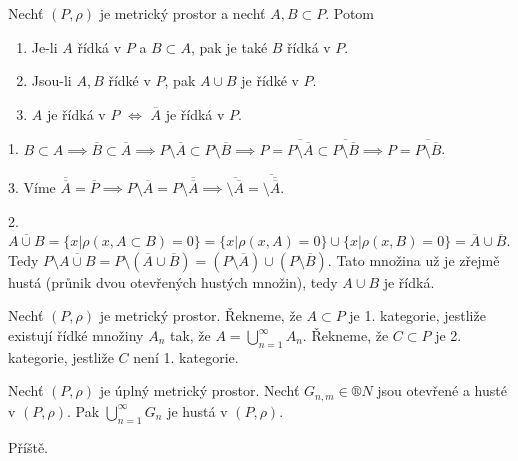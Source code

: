 \documentclass[12pt]{article}					%
\begin{document}
		\begin{veta}
			Nechť $(P, \rho)$ je metrický prostor a nechť $A, B \subset P$. Potom
			
			\begin{enumerate}
				\item Je-li $A$ řídká v $P$ a $B \subset A$, pak je také $B$ řídká v $P$.
				\item Jsou-li $A, B$ řídké v $P$, pak $A \cup B$ je řídké v $P$.
				\item $A$ je řídká v $P$ $\Leftrightarrow$ $\overline{A}$ je řídká v $P$.
			\end{enumerate}

			\begin{dukazin}
				1. $B \subset A \implies \overline{B} \subset \overline{A} \implies P \setminus \overline{A} \subset P \setminus \overline{B} \implies P = \overline{P\setminus \overline{A}} \subset \overline{P\setminus \overline{B}} \implies P = \overline{P\setminus \overline{B}}$.

				3. Víme $\overline{\overline{A}} = \overline{P} \implies P \setminus\overline{A} = P \setminus\overline{\overline{A}} \implies \overline{\setminus\overline{A}} = \overline{\setminus\overline{\overline{A}}}$.

				2. $\overline{A \cup B} = \{x | \rho(x, A \subset B) = 0\} = \{x | \rho(x, A) = 0\} \cup \{x | \rho(x, B) = 0\} = \overline{A} \cup \overline{B}$. Tedy $P \setminus \overline{A \cup B} = P \setminus(\overline{A} \cup \overline{B}) = (P\setminus\overline{A}) \cup (P \setminus \overline{B})$. Tato množina už je zřejmě hustá (průnik dvou otevřených hustých množin), tedy $A \cup B$ je řídká.
			\end{dukazin}
		\end{veta}

		\begin{definice}
			Nechť $(P, \rho)$ je metrický prostor. Řekneme, že $A \subset P$ je 1. kategorie, jestliže existují řídké množiny $A_n$ tak, že $A = \bigcup_{n=1}^∞ A_n$. Řekneme, že $C \subset P$ je 2. kategorie, jestliže $C$ není 1. kategorie.
		\end{definice}

		\begin{veta}[Baire]
			Nechť $(P, \rho)$ je úplný metrický prostor. Nechť $G_{n, m} \in ®N$ jsou otevřené a husté v $(P, \rho)$. Pak $\bigcup_{n=1}^∞ G_n$ je hustá v $(P, \rho)$.

			\begin{dukazin}
				Příště.
			\end{dukazin}
		\end{veta}
\end{document}

